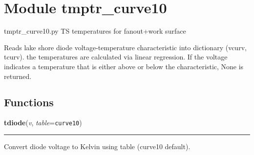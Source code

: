 %
%
%


\section{Module tmptr\_curve10}

    \label{tmptr_curve10}
tmptr\_curve10.py  TS temperatures for fanout+work surface

Reads lake shore diode voltage-temperature characteristic into dictionary 
(vcurv, tcurv).  the temperatures are calculated via linear regression. If 
the voltage indicates a temperature that is either above or below the 
characteristic, None is returned.



  \subsection{Functions}

    \label{tmptr_curve10:tdiode}

    \vspace{0.5ex}

    \begin{boxedminipage}{\textwidth}

    \raggedright \textbf{tdiode}(\textit{v}, \textit{table}=\texttt{curve10})

    \vspace{-1.5ex}

    \rule{\textwidth}{0.5\fboxrule}
    Convert diode voltage to Kelvin using table (curve10 default).

    \vspace{1ex}

    \end{boxedminipage}




